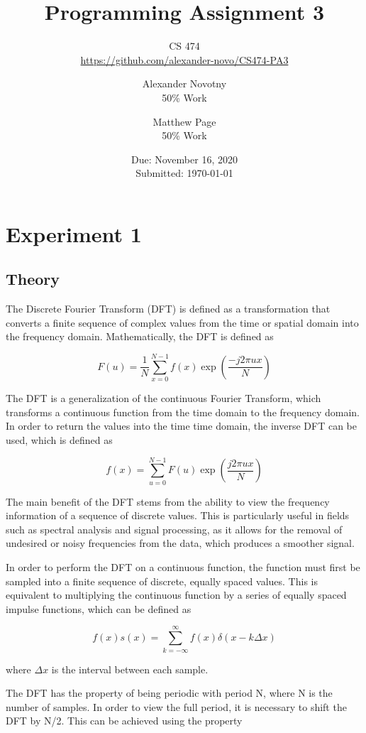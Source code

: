 \documentclass[headings=optiontoheadandtoc,listof=totoc,parskip=full]{scrartcl}
\title{Programming Assignment 3}
\subtitle{CS 474\\\url{https://github.com/alexander-novo/CS474-PA3}}
\author{Alexander Novotny\\50\% Work \and Matthew Page\\50\% Work}
\date{Due: November 16, 2020 \\ Submitted: \today}
\begin{document}
\maketitle
\tableofcontents
{}

\newpage
{}

\section{Experiment 1}
\label{sec:exp-1}

\subsection{Theory}

The Discrete Fourier Transform (DFT) is defined as a transformation that converts a finite sequence of complex values from the time or spatial domain into the frequency domain. Mathematically, the DFT is defined as 

    \[
    	F(u) = \frac{1}{N}\sum_{x=0}^{N-1} f(x) \exp(\frac{-j2\pi ux}{N})
    \]

The DFT is a generalization of the continuous Fourier Transform, which transforms a continuous function from the time domain to the frequency domain. In order to return the values into the time time domain, the inverse DFT can be used, which is defined as

    \[
    	f(x) = \sum_{u=0}^{N-1} F(u) \exp(\frac{j2\pi ux}{N})
    \]

The main benefit of the DFT stems from the ability to view the frequency information of a sequence of discrete values. This is particularly useful in fields such as spectral analysis and signal processing, as it allows for the removal of undesired or noisy frequencies from the data, which produces a smoother signal. 

In order to perform the DFT on a continuous function, the function must first be sampled into a finite sequence of discrete, equally spaced values. This is equivalent to multiplying the continuous function by a series of equally spaced impulse functions, which can be defined as 

    \[
    	f(x)s(x) = \sum_{k=-\infty}^{\infty} f(x) \delta(x-k\Delta x)
    \]

where \(\Delta x\) is the interval between each sample.

The DFT has the property of being periodic with period N, where N is the number of samples. In order to view the full period, it is necessary to shift the DFT by N/2. This can be achieved using the property 
\end{document}
